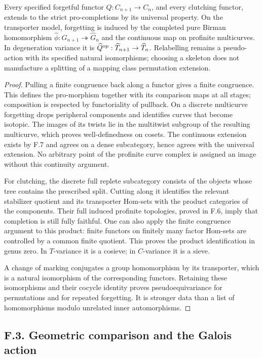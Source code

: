 Every specified forgetful functor $Q:C_{n+1}\to C_n$, and every clutching functor, extends to the strict pro-completions by its universal property. On the transporter model, forgetting is induced by the completed pure Birman homomorphism $\widehat\phi:\widehat G_{n+1}\twoheadrightarrow\widehat G_n$ and the continuous map on profinite multicurves. In degeneration variance it is $\widehat Q^{\mathrm{op}}:\widehat T_{n+1}\to\widehat T_n$. Relabelling remains a pseudo-action with its specified natural isomorphisms; choosing a skeleton does not manufacture a splitting of a mapping class permutation extension.
\begin{proof}
Pulling a finite congruence back along a functor gives a finite congruence. This defines the pro-morphism together with its comparison maps at all stages; composition is respected by functoriality of pullback. On a discrete multicurve forgetting drops peripheral components and identifies curves that become isotopic. The images of its twists lie in the multitwist subgroup of the resulting multicurve, which proves well-definedness on cosets. The continuous extension exists by F.7 and agrees on a dense subcategory, hence agrees with the universal extension. No arbitrary point of the profinite curve complex is assigned an image without this continuity argument.

For clutching, the discrete full replete subcategory consists of the objects whose tree contains the prescribed split. Cutting along it identifies the relevant stabilizer quotient and its transporter Hom-sets with the product categories of the components. Their full induced profinite topologies, proved in F.6, imply that completion is still fully faithful. One can also apply the finite congruence argument to this product: finite functors on finitely many factor Hom-sets are controlled by a common finite quotient. This proves the product identification in genus zero. In $T$-variance it is a cosieve; in $C$-variance it is a sieve.

A change of marking conjugates a group homomorphism by its transporter, which is a natural isomorphism of the corresponding functors. Retaining these isomorphisms and their cocycle identity proves pseudoequivariance for permutations and for repeated forgetting. It is stronger data than a list of homomorphisms modulo unrelated inner automorphisms.
\end{proof}

\subsection{F.3. Geometric comparison and the Galois action}

